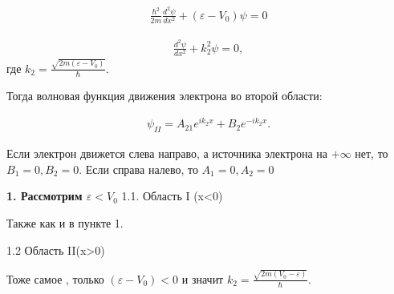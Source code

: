 \documentclass[__main__.tex]{subfiles}
\begin{document}
\begin{gather}
\label{movi5}
\frac{\hbar^{2}}{2m}\frac{d^{2}\psi}{dx^{2}}+(\varepsilon-V_{0})\psi=0
\end{gather}

\begin{gather}
\label{movi6}
\frac{d^{2}\psi}{dx^{2}}+k_{2}^{2}\psi=0,
\end{gather}
где $k_{2}=\frac{\sqrt{2m(\varepsilon-V_{0})}}{\hbar}$.

Тогда волновая функция движения электрона во второй  области:

\begin{gather}
\label{movi7}
\psi_{II}=A_{21}e^{ik_{2}x}+B_{2}e^{-ik_{2}x}.
\end{gather}

Если электрон движется слева направо, а источника электрона на $+\infty$ нет, то $B_{1}=0, B_{2}=0$. Если справа налево, то  $A_{1}=0, A_{2}=0$

\textbf{1. Рассмотрим  $\varepsilon<V_{0}$ }
1.1. Область I (x<0)

Также как и в пункте 1.


1.2 Область II(x>0)

Тоже самое , только $(\varepsilon-V_{0})<0$ и значит  $k_{2}=\frac{\sqrt{2m(V_{0}-\varepsilon)}}{\hbar}$.
\end{document}
